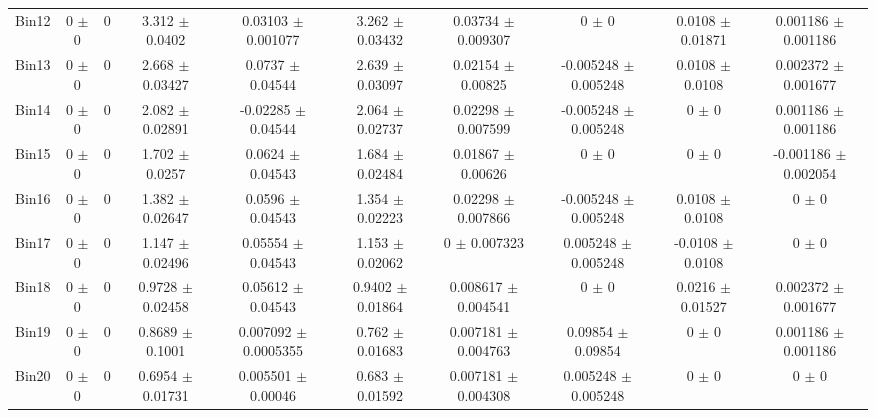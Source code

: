 \begin{tabular}{@{\extracolsep{4pt}}lccccccccc@{}}
     Bin12 & 0 $\pm$ 0 & 0 & 3.312 $\pm$ 0.0402 & 0.03103 $\pm$ 0.001077 & 3.262 $\pm$ 0.03432 & 0.03734 $\pm$ 0.009307 & 0 $\pm$ 0 & 0.0108 $\pm$ 0.01871 & 0.001186 $\pm$ 0.001186 \\ 
     Bin13 & 0 $\pm$ 0 & 0 & 2.668 $\pm$ 0.03427 & 0.0737 $\pm$ 0.04544 & 2.639 $\pm$ 0.03097 & 0.02154 $\pm$ 0.00825 & -0.005248 $\pm$ 0.005248 & 0.0108 $\pm$ 0.0108 & 0.002372 $\pm$ 0.001677 \\ 
     Bin14 & 0 $\pm$ 0 & 0 & 2.082 $\pm$ 0.02891 & -0.02285 $\pm$ 0.04544 & 2.064 $\pm$ 0.02737 & 0.02298 $\pm$ 0.007599 & -0.005248 $\pm$ 0.005248 & 0 $\pm$ 0 & 0.001186 $\pm$ 0.001186 \\ 
     Bin15 & 0 $\pm$ 0 & 0 & 1.702 $\pm$ 0.0257 & 0.0624 $\pm$ 0.04543 & 1.684 $\pm$ 0.02484 & 0.01867 $\pm$ 0.00626 & 0 $\pm$ 0 & 0 $\pm$ 0 & -0.001186 $\pm$ 0.002054 \\ 
     Bin16 & 0 $\pm$ 0 & 0 & 1.382 $\pm$ 0.02647 & 0.0596 $\pm$ 0.04543 & 1.354 $\pm$ 0.02223 & 0.02298 $\pm$ 0.007866 & -0.005248 $\pm$ 0.005248 & 0.0108 $\pm$ 0.0108 & 0 $\pm$ 0 \\ 
     Bin17 & 0 $\pm$ 0 & 0 & 1.147 $\pm$ 0.02496 & 0.05554 $\pm$ 0.04543 & 1.153 $\pm$ 0.02062 & 0 $\pm$ 0.007323 & 0.005248 $\pm$ 0.005248 & -0.0108 $\pm$ 0.0108 & 0 $\pm$ 0 \\ 
     Bin18 & 0 $\pm$ 0 & 0 & 0.9728 $\pm$ 0.02458 & 0.05612 $\pm$ 0.04543 & 0.9402 $\pm$ 0.01864 & 0.008617 $\pm$ 0.004541 & 0 $\pm$ 0 & 0.0216 $\pm$ 0.01527 & 0.002372 $\pm$ 0.001677 \\ 
     Bin19 & 0 $\pm$ 0 & 0 & 0.8689 $\pm$ 0.1001 & 0.007092 $\pm$ 0.0005355 & 0.762 $\pm$ 0.01683 & 0.007181 $\pm$ 0.004763 & 0.09854 $\pm$ 0.09854 & 0 $\pm$ 0 & 0.001186 $\pm$ 0.001186 \\ 
     Bin20 & 0 $\pm$ 0 & 0 & 0.6954 $\pm$ 0.01731 & 0.005501 $\pm$ 0.00046 & 0.683 $\pm$ 0.01592 & 0.007181 $\pm$ 0.004308 & 0.005248 $\pm$ 0.005248 & 0 $\pm$ 0 & 0 $\pm$ 0 \\ 
\hline\hline
  \end{tabular}
